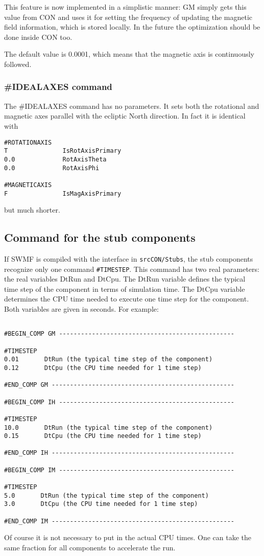This feature is now implemented in a simplistic manner: GM
simply gets this value from CON and uses it for setting the frequency of
updating the magnetic field information, which is stored locally.
In the future the optimization should be done inside CON too.

The default value is 0.0001, which means that the magnetic axis
is continuously followed.

\subsubsection{\#IDEALAXES command}

The \#IDEALAXES command has no parameters. It sets both the rotational
and magnetic axes parallel with the ecliptic North direction. In fact
it is identical with 
\begin{verbatim}
#ROTATIONAXIS
T               IsRotAxisPrimary
0.0             RotAxisTheta
0.0             RotAxisPhi

#MAGNETICAXIS
F               IsMagAxisPrimary
\end{verbatim}
but much shorter.

\subsection{Command for the stub components}

If SWMF is compiled with the interface in {\tt srcCON/Stubs},
the stub components recognize only one command {\tt \#TIMESTEP}.
This command has two real parameters: the real variables
DtRun and DtCpu. The DtRun variable defines the typical time step of 
the component in terms of simulation time. The DtCpu variable 
determines the CPU time needed to execute one time step for the component.
Both variables are given in seconds. For example:
\begin{verbatim}

#BEGIN_COMP GM ------------------------------------------------

#TIMESTEP
0.01       DtRun (the typical time step of the component)
0.12       DtCpu (the CPU time needed for 1 time step)

#END_COMP GM --------------------------------------------------

#BEGIN_COMP IH ------------------------------------------------

#TIMESTEP
10.0       DtRun (the typical time step of the component)
0.15       DtCpu (the CPU time needed for 1 time step)

#END_COMP IH --------------------------------------------------

#BEGIN_COMP IM ------------------------------------------------

#TIMESTEP
5.0       DtRun (the typical time step of the component)
3.0       DtCpu (the CPU time needed for 1 time step)

#END_COMP IM --------------------------------------------------

\end{verbatim}
Of course it is not necessary to put in the actual CPU times.
One can take the same fraction for all components to accelerate
the run.
